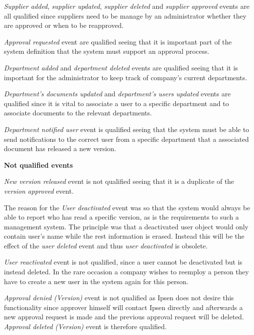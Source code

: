 \textit{Supplier added}, \textit{supplier updated},  \textit{supplier deleted} and \textit{supplier approved} events are all qualified since suppliers need to be manage by an administrator whether they are approved or when to be reapproved.

\textit{Approval requested} event are qualified seeing that it is important part of the system definition that the system must support an approval process.

\textit{Department added} and \textit{department deleted} events are qualified seeing that it is important for the administrator to keep track of company's current departments.

\textit{Department's documents updated} and \textit{department's users updated} events are qualified since it is vital to associate a user to a specific department and to associate documents to the relevant departments.

\textit{Department notified user} event is qualified seeing that the system must be able to send notifications to the correct user from a specific department that a associated document has released a new version.

\textbf{Not qualified events}

\textit{New version released} event is not qualified seeing that it is a duplicate of the \textit{version approved} event.

The reason for the \textit{User deactivated} event was so that the system would always be able to report who has read a specific version, as is the requirements to such a management system. The principle was that a deactivated user object would only contain user's name while the rest information is erased. Instead this will be the effect of the \textit{user deleted} event and thus \textit{user deactivated} is obsolete.

\textit{User reactivated} event is not qualified, since a user cannot be deactivated but is instead deleted. In the rare occasion a company wishes to reemploy a person they have to create a new user in the system again for this person.



\textit{Approval denied (Version)} event is not qualified as Ipsen does not desire this functionality since approver himself will contact Ipsen directly and afterwards a new approval request is made and the previous approval request will be deleted. \textit{Approval deleted (Version)} event is therefore qualified.

